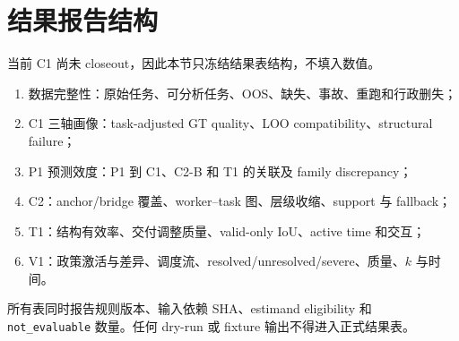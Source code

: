 \section{结果报告结构}

当前 C1 尚未 closeout，因此本节只冻结结果表结构，不填入数值。

\begin{enumerate}
  \item 数据完整性：原始任务、可分析任务、OOS、缺失、事故、重跑和行政删失；
  \item C1 三轴画像：task-adjusted GT quality、LOO compatibility、structural failure；
  \item P1 预测效度：P1 到 C1、C2-B 和 T1 的关联及 family discrepancy；
  \item C2：anchor/bridge 覆盖、worker--task 图、层级收缩、support 与 fallback；
  \item T1：结构有效率、交付调整质量、valid-only IoU、active time 和交互；
  \item V1：政策激活与差异、调度流、resolved/unresolved/severe、质量、$k$ 与时间。
\end{enumerate}

所有表同时报告规则版本、输入依赖 SHA、estimand eligibility 和
\texttt{not\_evaluable} 数量。任何 dry-run 或 fixture 输出不得进入正式结果表。

